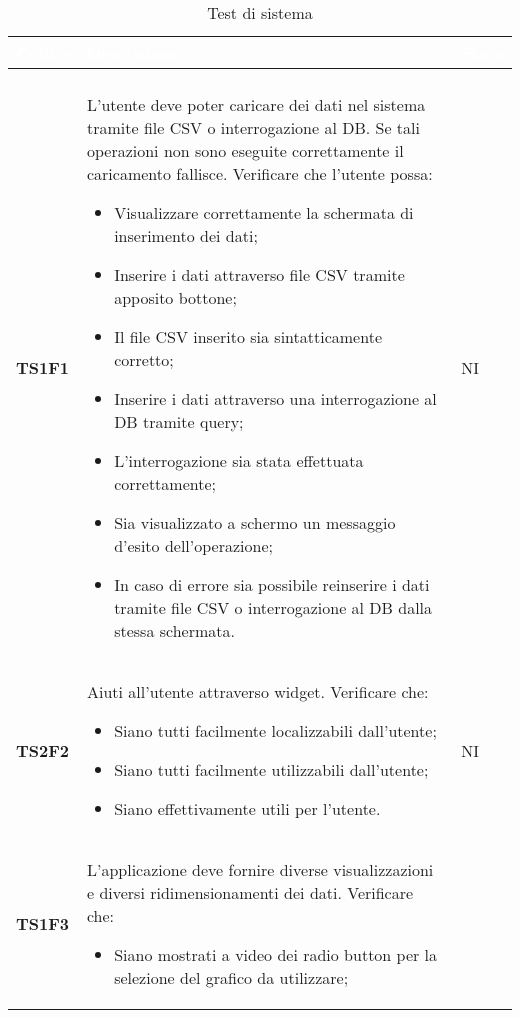 \begin{longtable}{C{2.5cm} C{12cm} C{2cm}} 
		\textcolor{white}{\textbf{Codice}} & 
		\textcolor{white}{\textbf{Descrizione}} & 
		\textcolor{white}{\textbf{Stato}} \\
		\endfirsthead
		\\
	    \endfoot
	    \caption{Test di sistema}
	    \endlastfoot
		\hline
\textbf{TS1F1} & L'utente deve poter caricare dei dati nel sistema tramite file CSV o interrogazione al DB. Se tali operazioni non sono eseguite correttamente il caricamento fallisce. Verificare che l'utente possa: 
					\begin{itemize}
						\item Visualizzare correttamente la schermata di inserimento dei dati;
						\item Inserire i dati attraverso file CSV tramite apposito bottone;
						\item Il file CSV inserito sia sintatticamente corretto; 
						\item Inserire i dati attraverso una interrogazione al DB tramite query;
						\item L'interrogazione sia stata effettuata correttamente;
						\item Sia visualizzato a schermo un messaggio d'esito dell'operazione;
						\item In caso di errore sia possibile reinserire i dati tramite file CSV o interrogazione al DB dalla stessa schermata.
					\end{itemize}					 			    
			  & NI\\
\textbf{TS2F2} &  Aiuti all'utente attraverso widget. Verificare che:
					\begin{itemize}
						\item Siano tutti facilmente localizzabili dall'utente;
						\item Siano tutti facilmente utilizzabili dall'utente;
						\item Siano effettivamente utili per l'utente.
					\end{itemize}	
 			   & NI \\ 
\textbf{TS1F3} &  L'applicazione deve fornire diverse visualizzazioni e diversi ridimensionamenti dei dati. Verificare che: 
					\begin{itemize}
						\item Siano mostrati a video dei radio button per la selezione del grafico da utilizzare;

\end{itemize}
\end{longtable}
